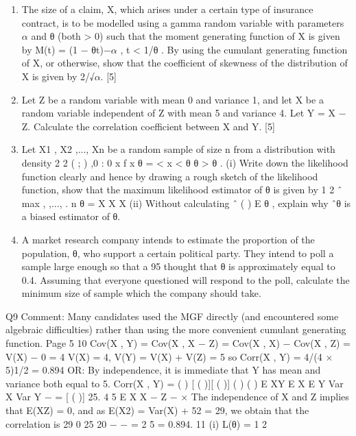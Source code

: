 \documentclass[a4paper,12pt]{article}
\begin{document}
\begin{enumerate}
\item The size of a claim, X, which arises under a certain type of insurance contract, is
to be modelled using a gamma random variable with parameters $\alpha$ and θ
(both > 0) such that the moment generating function of X is given by
M(t) = (1 − θt)−$\alpha$ , t < 1/θ .
By using the cumulant generating function of X, or otherwise, show that the
coefficient of skewness of the distribution of X is given by 2/√$\alpha$. [5]
\item  Let Z be a random variable with mean 0 and variance 1, and let X be a random
variable independent of Z with mean 5 and variance 4. Let Y = X − Z.
Calculate the correlation coefficient between X and Y. [5]
\item Let X1 , X2 ,..., Xn be a random sample of size n from a distribution with density
2
2
( ; ) ,0 : 0
x
f x θ = < x < θ θ >
θ
.
(i) Write down the likelihood function clearly and hence by drawing a rough
sketch of the likelihood function, show that the maximum likelihood
estimator of θ is given by 1 2
ˆ max{ , ,..., }. n θ = X X X 
(ii) Without calculating ˆ ( ) E θ , explain why ˆθ is a biased estimator of θ. 
\item A market research company intends to estimate the proportion of the population,
θ, who support a certain political party. They intend to poll a sample large
enough so that a 95%
thought that θ is approximately equal to 0.4.
Assuming that everyone questioned will respond to the poll, calculate the
minimum size of sample which the company should take. 
\end{enumerate}
Q9 Comment: Many candidates used the MGF directly (and encountered some
algebraic difficulties) rather than using the more convenient cumulant generating
function.
Page 5
10 Cov(X , Y) = Cov(X , X − Z) = Cov(X , X) − Cov(X , Z) = V(X) − 0 = 4
V(X) = 4, V(Y) = V(X) + V(Z) = 5
so Corr(X , Y) = 4/(4 × 5)1/2 = 0.894
OR:
By independence, it is immediate that Y has mean and variance both equal
to 5.
Corr(X , Y) =
( ) [ ( )][ ( )]
( ) ( )
E XY E X E Y
Var X Var Y
− =
[ ( )] 25.
4 5
E X X − Z −
×
The independence of X and Z implies that E(XZ) = 0, and as
E(X2) = Var(X) + 52 = 29, we obtain that the correlation is
29 0 25
20
− − =
2
5
= 0.894.
11 (i) L(θ) = 1 2
\end{document}
